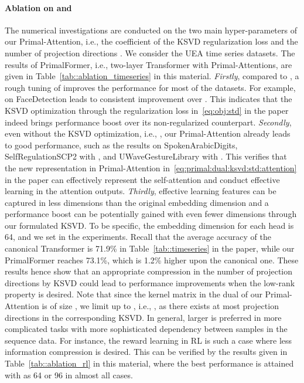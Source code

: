 \documentclass{article}
\begin{document}
\paragraph{Ablation on  and }
The numerical investigations are conducted on the two main hyper-parameters of our Primal-Attention, i.e., the coefficient  of the KSVD regularization loss and the number of projection directions .
We consider the UEA time series datasets.
The results of PrimalFormer, i.e., two-layer Transformer with Primal-Attentions, are given in Table~\ref{tab::ablation_timeseries} in this material.
\emph{Firstly}, compared to , a rough tuning of  improves the performance for most of  the datasets.
For example,  on FaceDetection leads to consistent improvement over .
This indicates that the KSVD optimization through the regularization loss  in~\eqref{eq:obj:std} in the paper indeed brings performance boost over its non-regularized counterpart.
\emph{Secondly}, even without the KSVD optimization, i.e., , our Primal-Attention already leads to good performance, such as the results on SpokenArabicDigits, SelfRegulationSCP2 with , and UWaveGestureLibrary with . 
This verifies that the new representation in Primal-Attention in~\eqref{eq:primal:dual:ksvd:std:attention} in the paper can effectively represent the self-attention and conduct effective learning in the attention outputs.
\emph{Thirdly}, effective learning features can be captured in less dimensions than the original embedding dimension and a performance boost can be potentially gained with even fewer dimensions through our formulated KSVD.
To be specific, the embedding dimension for each head is 64, and we set  in the experiments.
Recall that the average accuracy of the canonical Transformer is 71.9\% in Table~\ref{tab::timeseries} in the paper, while our PrimalFormer reaches 73.1\%, which is 1.2\% higher upon the canonical one.
These results hence show that an appropriate compression in the number of projection directions by KSVD could lead to performance improvements when the low-rank property is desired.
Note that since the  kernel matrix in the dual of our Primal-Attention is of size , we limit  up to , i.e., , as there exists at most  projection directions in the corresponding KSVD.
In general, larger  is preferred in more complicated tasks with more sophisticated dependency between samples in the sequence data.
For instance, the reward learning in RL is such a case where less information compression is desired.  
This can be verified by the results given in Table~\ref{tab::ablation_rl} in this material, where the best performance is attained with  as 64 or 96 in almost all cases.
\end{document}
